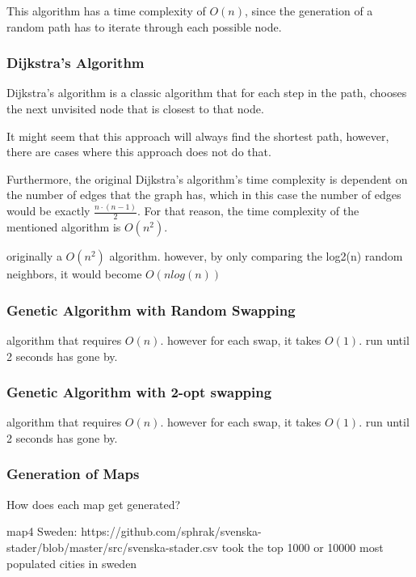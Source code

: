 \documentclass{article}
\begin{document}
\noindent
This algorithm has a time complexity of $O(n)$, since the generation of a random path has to iterate through each possible node. 

\subsubsection{Dijkstra's Algorithm}\label{Dijkstras}
Dijkstra's algorithm is a classic algorithm that for each step in the path, chooses the next unvisited node that is closest to that node. 



It might seem that this approach will always find the shortest path, however, there are cases where this approach does not do that. 


Furthermore, the original Dijkstra's algorithm's time complexity is dependent on the number of edges that the graph has, which in this case the number of edges would be exactly $\frac{n \cdot (n-1)}{2}$. For that reason, the time complexity of the mentioned algorithm is $O(n^2)$.



originally a $O(n^2)$ algorithm. however, by only comparing the log2(n) random neighbors, it would become $O(nlog(n))$

\subsubsection{Genetic Algorithm with Random Swapping}\label{Random Swapping}
algorithm that requires $O(n)$. however for each swap, it takes $O(1)$. run until 2 seconds has gone by.

\subsubsection{Genetic Algorithm with 2-opt swapping}\label{2-opt swapping}
algorithm that requires $O(n)$. however for each swap, it takes $O(1)$. run until 2 seconds has gone by.

\subsubsection{Generation of Maps}\label{subsubsec1}
How does each map get generated?

map4 Sweden: https://github.com/sphrak/svenska-stader/blob/master/src/svenska-stader.csv  took the top 1000 or 10000 most populated cities in sweden
\end{document}
